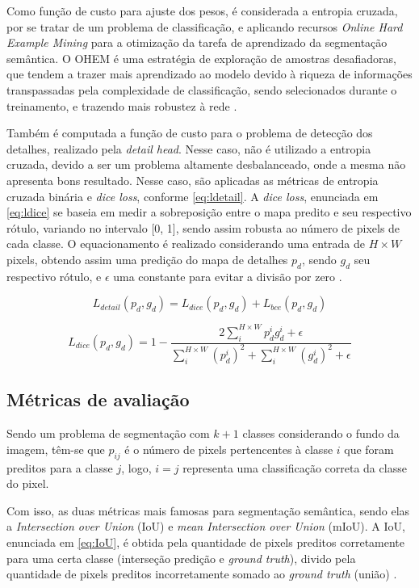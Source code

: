 \documentclass[conference]{IEEEtran}
\begin{document}
Como função de custo para ajuste dos pesos, é considerada a entropia cruzada, por se tratar de um problema de classificação, e aplicando recursos \textit{Online Hard Example Mining} para a otimização da tarefa de aprendizado da segmentação semântica. O OHEM é uma estratégia de exploração de amostras desafiadoras, que tendem a trazer mais aprendizado ao modelo devido à riqueza de informações transpassadas pela complexidade de classificação, sendo selecionados durante o treinamento, e trazendo mais robustez à rede \cite{shrivastava2016TrainingRegionbasedObject}. 

Também é computada a função de custo para o problema de detecção dos detalhes, realizado pela \textit{detail head}. Nesse caso, não é utilizado a entropia cruzada, devido a ser um problema altamente desbalanceado, onde a mesma não apresenta bons resultado. Nesse caso, são aplicadas as métricas de entropia cruzada binária e \textit{dice loss}, conforme \eqref{eq:ldetail}. A \textit{dice loss}, enunciada em \eqref{eq:ldice} se baseia em medir a sobreposição entre o mapa predito e seu respectivo rótulo, variando no intervalo [0, 1], sendo assim robusta ao número de pixels de cada classe. O equacionamento é realizado considerando uma entrada de $H \times W$ pixels, obtendo assim uma predição do mapa de detalhes $p_d$, sendo $g_d$ seu respectivo rótulo, e $\epsilon$ uma constante para evitar a divisão por zero \cite{deng2018LearningPredictCrisp}.

\begin{equation}\label{eq:ldetail}
	L_{detail}(p_d,g_d) = L_{dice}(p_d, g_d) + L_{bce}(p_d, g_d)
\end{equation}

\begin{equation}\label{eq:ldice}
	L_{dice}(p_d, g_d) = 1 - \frac{2\sum_{i}^{H\times W}p_d^ig_d^i + \epsilon}{\sum_{i}^{H\times W}(p_d^i)^2 + \sum_{i}^{H\times W}(g_d^i)^2 + \epsilon}
\end{equation}


\subsection{Métricas de avaliação}

Sendo um problema de segmentação com $k +1$ classes considerando o fundo da imagem, têm-se que $p_{ij}$ é o número de pixels pertencentes à classe $i$ que foram preditos para a classe $j$, logo, $i = j$ representa uma classificação correta da classe do pixel.

Com isso, as duas métricas mais famosas para segmentação semântica, sendo elas a \textit{Intersection over Union} (IoU) e \textit{mean Intersection over Union} (mIoU). A IoU, enunciada em \eqref{eq:IoU}, é obtida pela quantidade de pixels preditos corretamente para uma certa classe (interseção predição e \textit{ground truth}), divido pela quantidade de pixels preditos incorretamente somado ao \textit{ground truth} (união) \cite{papadeas2021RealTimeSemanticImage}. 
\end{document}
